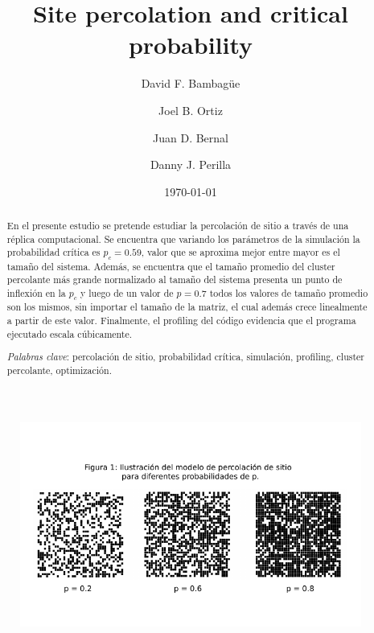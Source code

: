 \documentclass{article}
\begin{document}
\title{Site percolation and critical probability}

\author[1]{
  David F. Bambagüe
}
\author[2]{
  Joel B. Ortiz
}
\author[3]{
  Juan D. Bernal
}
\author[4]{
  Danny J. Perilla
}

\date{\today}

\maketitle

\begin{abstract}
 En el presente estudio se pretende estudiar la percolación de sitio a través de una réplica computacional. Se encuentra que variando los parámetros de la simulación la probabilidad crítica es $p_c=0.59$, valor que se aproxima mejor entre mayor es el tamaño del sistema. Además, se encuentra que el tamaño promedio del cluster percolante más grande normalizado al tamaño del sistema presenta un punto de inflexión en la $p_c$ y luego de un valor de $p=0.7$ todos los valores de tamaño promedio son los mismos, sin importar el tamaño de la matriz, el cual además crece linealmente a partir de este valor. Finalmente, el profiling del código evidencia que el programa ejecutado escala cúbicamente. 
 
\noindent\textit{Palabras clave}: percolación de sitio, probabilidad crítica, simulación, profiling, cluster percolante, optimización.
\end{abstract}
\vspace{-1cm}
\begin{figure}[h]
    \begin{center}
    \includegraphics[scale=1]{percolation.pdf}
    \label{fig1}
    \end{center}
\end{figure}
\end{document}
